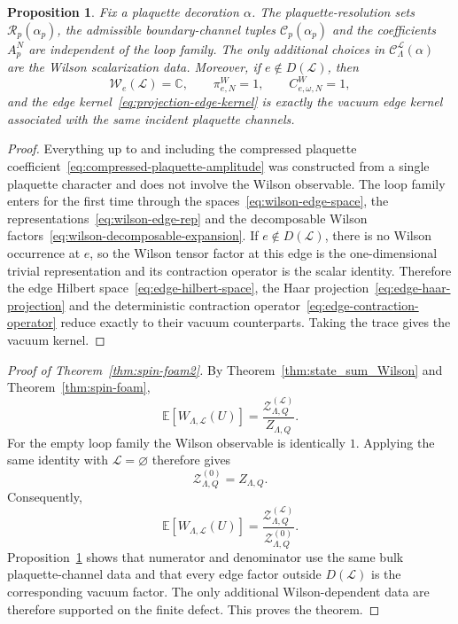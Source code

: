 \documentclass[11pt,a4paper,reqno]{article}
\newtheorem{proposition}[theorem]{Proposition}
\theoremstyle{definition}
\theoremstyle{remark}
\newcommand\C{\mathbb{C}}
\newcommand\E{\mathbb{E}}
\newcommand\Lc{{\mathcal{L}}}
\begin{document}
\begin{proposition}\label{prop:finite-range-defect-property}
Fix a plaquette decoration $\alpha$. The plaquette-resolution sets $\mathcal R_p(\alpha_p)$, the admissible boundary-channel tuples $\mathcal C_p(\alpha_p)$ and the coefficients $A_p^N$ are independent of the loop family. The only additional choices in $\mathcal C^\Lc_\Lambda(\alpha)$ are the Wilson scalarization data. Moreover, if $e\notin D(\Lc)$, then
\[
\mathcal W_e(\Lc)=\C,
\qquad \pi^W_{e,N}=1,
\qquad C^W_{e,\omega,N}=1,
\]
and the edge kernel~\eqref{eq:projection-edge-kernel} is exactly the vacuum edge kernel associated with the same incident plaquette channels.
\end{proposition}

\begin{proof}
Everything up to and including the compressed plaquette coefficient~\eqref{eq:compressed-plaquette-amplitude} was constructed from a single plaquette character and does not involve the Wilson observable. The loop family enters for the first time through the spaces~\eqref{eq:wilson-edge-space}, the representations~\eqref{eq:wilson-edge-rep} and the decomposable Wilson factors~\eqref{eq:wilson-decomposable-expansion}. If $e\notin D(\Lc)$, there is no Wilson occurrence at $e$, so the Wilson tensor factor at this edge is the one-dimensional trivial representation and its contraction operator is the scalar identity. Therefore the edge Hilbert space~\eqref{eq:edge-hilbert-space}, the Haar projection~\eqref{eq:edge-haar-projection} and the deterministic contraction operator~\eqref{eq:edge-contraction-operator} reduce exactly to their vacuum counterparts. Taking the trace gives the vacuum kernel.
\end{proof}

\begin{proof}[Proof of Theorem~\ref{thm:spin-foam2}]
By Theorem~\ref{thm:state_sum_Wilson} and Theorem~\ref{thm:spin-foam},
\[
\E[W_{\Lambda,\Lc}(U)]
=\frac{\mathcal Z_{\Lambda,Q}^{(\Lc)}}{Z_{\Lambda,Q}}.
\]
For the empty loop family the Wilson observable is identically $1$. Applying the same identity with $\Lc=\varnothing$ therefore gives
\[
\mathcal Z_{\Lambda,Q}^{(0)}=Z_{\Lambda,Q}.
\]
Consequently,
\[
\E[W_{\Lambda,\Lc}(U)]
=\frac{\mathcal Z_{\Lambda,Q}^{(\Lc)}}{\mathcal Z_{\Lambda,Q}^{(0)}}.
\]
Proposition~\ref{prop:finite-range-defect-property} shows that numerator and denominator use the same bulk plaquette-channel data and that every edge factor outside $D(\Lc)$ is the corresponding vacuum factor. The only additional Wilson-dependent data are therefore supported on the finite defect. This proves the theorem.
\end{proof}
\end{document}
